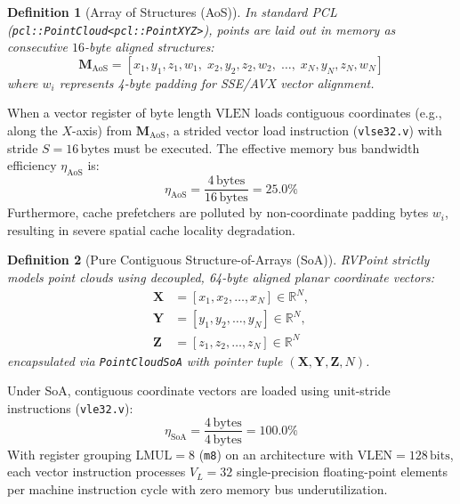 \documentclass[journal,compsoc]{IEEEtran}
\newtheorem{definition}{Definition}
\begin{document}
\begin{definition}[Array of Structures (AoS)]
In standard PCL (\texttt{pcl::PointCloud<pcl::PointXYZ>}), points are laid out in memory as consecutive $16$-byte aligned structures:
\begin{equation}
\mathbf{M}_{\text{AoS}} = \left[ x_1, y_1, z_1, w_1, \; x_2, y_2, z_2, w_2, \; \dots, \; x_N, y_N, z_N, w_N \right]
\end{equation}
where $w_i$ represents 4-byte padding for SSE/AVX vector alignment.
\end{definition}

When a vector register of byte length $\text{VLEN}$ loads contiguous coordinates (e.g., along the $X$-axis) from $\mathbf{M}_{\text{AoS}}$, a strided vector load instruction (\texttt{vlse32.v}) with stride $S = 16\,\text{bytes}$ must be executed. The effective memory bus bandwidth efficiency $\eta_{\text{AoS}}$ is:
\begin{equation}
\eta_{\text{AoS}} = \frac{4\,\text{bytes}}{16\,\text{bytes}} = 25.0\%
\end{equation}
Furthermore, cache prefetchers are polluted by non-coordinate padding bytes $w_i$, resulting in severe spatial cache locality degradation.

\begin{definition}[Pure Contiguous Structure-of-Arrays (SoA)]
RVPoint strictly models point clouds using decoupled, 64-byte aligned planar coordinate vectors:
\begin{align}
\mathbf{X} &= [x_1, x_2, \dots, x_N] \in \mathbb{R}^N, \\
\mathbf{Y} &= [y_1, y_2, \dots, y_N] \in \mathbb{R}^N, \\
\mathbf{Z} &= [z_1, z_2, \dots, z_N] \in \mathbb{R}^N
\end{align}
encapsulated via \texttt{PointCloudSoA} with pointer tuple $(\mathbf{X}, \mathbf{Y}, \mathbf{Z}, N)$.
\end{definition}

Under SoA, contiguous coordinate vectors are loaded using unit-stride instructions (\texttt{vle32.v}):
\begin{equation}
\eta_{\text{SoA}} = \frac{4\,\text{bytes}}{4\,\text{bytes}} = 100.0\%
\end{equation}
With register grouping $\text{LMUL} = 8$ (\texttt{m8}) on an architecture with $\text{VLEN} = 128\,\text{bits}$, each vector instruction processes $V_L = 32$ single-precision floating-point elements per machine instruction cycle with zero memory bus underutilization.
\end{document}
